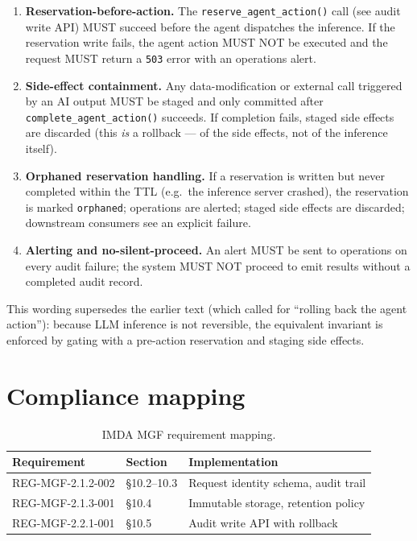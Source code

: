 \documentclass[11pt,a4paper,twoside]{report}
\begin{document}
\begin{enumerate}
\item \textbf{Reservation-before-action.} The
\texttt{reserve\_agent\_action()} call (see audit write
API) MUST succeed before the agent dispatches the
inference. If the reservation write fails, the agent
action MUST NOT be executed and the request MUST return a
\texttt{503} error with an operations alert.
\item \textbf{Side-effect containment.} Any data-modification or
external call triggered by an AI output MUST be staged and
only committed after \texttt{complete\_agent\_action()}
succeeds. If completion fails, staged side effects are
discarded (this \emph{is} a rollback --- of the side
effects, not of the inference itself).
\item \textbf{Orphaned reservation handling.} If a reservation
is written but never completed within the TTL (e.g.\ the
inference server crashed), the reservation is marked
\texttt{orphaned}; operations are alerted; staged side
effects are discarded; downstream consumers see an
explicit failure.
\item \textbf{Alerting and no-silent-proceed.} An alert MUST be
sent to operations on every audit failure; the system
MUST NOT proceed to emit results without a completed audit
record.
\end{enumerate}

\noindent
This wording supersedes the earlier text (which called for
``rolling back the agent action''): because LLM inference is not
reversible, the equivalent invariant is enforced by gating with a
pre-action reservation and staging side effects.

\section{Compliance mapping}

\begin{table}[htbp]
\centering
\caption{IMDA MGF requirement mapping.}
\label{tab:mgf-mapping}
\footnotesize
\begin{tabularx}{\linewidth}{@{}l l X@{}}
\toprule
\textbf{Requirement} & \textbf{Section} & \textbf{Implementation} \\ \midrule
REG-MGF-2.1.2-002 & \S10.2--10.3 & Request identity schema, audit trail \\
REG-MGF-2.1.3-001 & \S10.4 & Immutable storage, retention policy \\
REG-MGF-2.2.1-001 & \S10.5 & Audit write API with rollback \\
\bottomrule
\end{tabularx}
\end{table}
\end{document}
